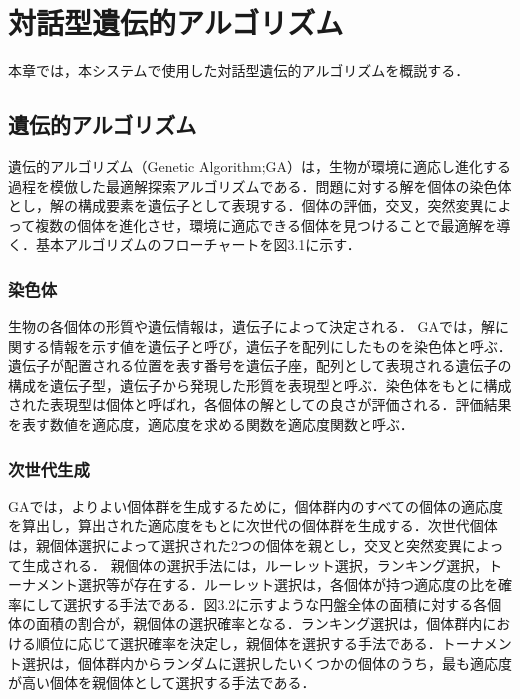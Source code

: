 \chapter{対話型遺伝的アルゴリズム}
本章では，本システムで使用した対話型遺伝的アルゴリズムを概説する．
\section{遺伝的アルゴリズム}
遺伝的アルゴリズム（Genetic Algorithm;GA）は，生物が環境に適応し進化する過程を模倣した最適解探索アルゴリズムである．問題に対する解を個体の染色体とし，解の構成要素を遺伝子として表現する．個体の評価，交叉，突然変異によって複数の個体を進化させ，環境に適応できる個体を見つけることで最適解を導く．基本アルゴリズムのフローチャートを図3.1に示す．

\subsection{染色体}
生物の各個体の形質や遺伝情報は，遺伝子によって決定される．
GAでは，解に関する情報を示す値を遺伝子と呼び，遺伝子を配列にしたものを染色体と呼ぶ．
遺伝子が配置される位置を表す番号を遺伝子座，配列として表現される遺伝子の構成を遺伝子型，遺伝子から発現した形質を表現型と呼ぶ．染色体をもとに構成された表現型は個体と呼ばれ，各個体の解としての良さが評価される．評価結果を表す数値を適応度，適応度を求める関数を適応度関数と呼ぶ．

\subsection{次世代生成}
GAでは，よりよい個体群を生成するために，個体群内のすべての個体の適応度を算出し，算出された適応度をもとに次世代の個体群を生成する．次世代個体は，親個体選択によって選択された2つの個体を親とし，交叉と突然変異によって生成される．
親個体の選択手法には，ルーレット選択，ランキング選択，トーナメント選択等が存在する．ルーレット選択は，各個体が持つ適応度の比を確率にして選択する手法である．図3.2に示すような円盤全体の面積に対する各個体の面積の割合が，親個体の選択確率となる．ランキング選択は，個体群内における順位に応じて選択確率を決定し，親個体を選択する手法である．トーナメント選択は，個体群内からランダムに選択したいくつかの個体のうち，最も適応度が高い個体を親個体として選択する手法である．

